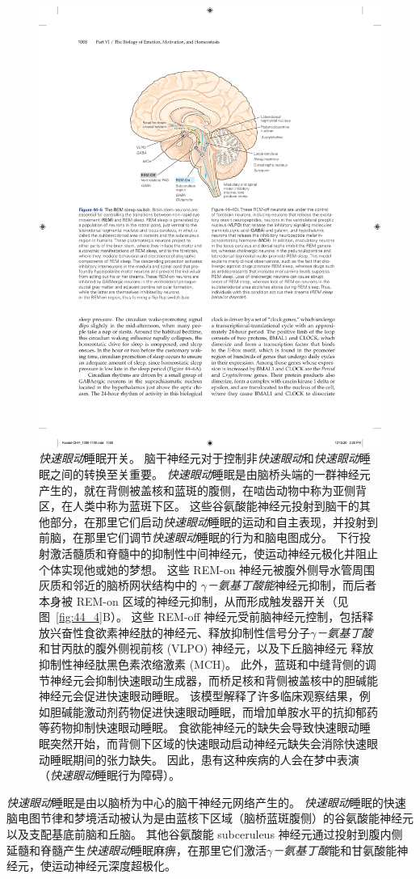 \begin{figure}[htbp]
	\centering
	\includegraphics[width=0.6\linewidth]{chap44/fig_44_5}
	\caption{\textit{快速眼动}睡眠开关。 脑干神经元对于控制非\textit{快速眼动}和\textit{快速眼动}睡眠之间的转换至关重要。
		\textit{快速眼动}睡眠是由脑桥头端的一群神经元产生的，就在背侧被盖核和蓝斑的腹侧，在啮齿动物中称为亚侧背区，在人类中称为蓝斑下区。
		这些谷氨酸能神经元投射到脑干的其他部分，在那里它们启动\textit{快速眼动}睡眠的运动和自主表现，并投射到前脑，在那里它们调节\textit{快速眼动}睡眠的行为和脑电图成分。
		下行投射激活髓质和脊髓中的抑制性中间神经元，使运动神经元极化并阻止个体实现他或她的梦想。
		这些 REM-on 神经元被腹外侧导水管周围灰质和邻近的脑桥网状结构中的 \textit{$\gamma$－氨基丁酸能}神经元抑制，而后者本身被 REM-on 区域的神经元抑制，从而形成触发器开关（见图~\ref{fig:44_4}B）。
		这些 REM-off 神经元受前脑神经元控制，包括释放兴奋性食欲素神经肽的神经元、释放抑制性信号分子\textit{$\gamma$－氨基丁酸}和甘丙肽的腹外侧视前核 (VLPO) 神经元，以及下丘脑神经元 释放抑制性神经肽黑色素浓缩激素 (MCH)。
		此外，蓝斑和中缝背侧的调节神经元会抑制快速眼动生成器，而桥足核和背侧被盖核中的胆碱能神经元会促进快速眼动睡眠。
		该模型解释了许多临床观察结果，例如胆碱能激动剂药物促进快速眼动睡眠，而增加单胺水平的抗抑郁药等药物抑制快速眼动睡眠。
		食欲能神经元的缺失会导致快速眼动睡眠突然开始，而背侧下区域的快速眼动启动神经元缺失会消除快速眼动睡眠期间的张力缺失。
		因此，患有这种疾病的人会在梦中表演（\textit{快速眼动}睡眠行为障碍）。}
	\label{fig:44_5}
\end{figure}


\textit{快速眼动}睡眠是由以脑桥为中心的脑干神经元网络产生的。
\textit{快速眼动}睡眠的快速脑电图节律和梦境活动被认为是由蓝核下区域（脑桥蓝斑腹侧）的谷氨酸能神经元以及支配基底前脑和丘脑。
其他谷氨酸能 subceruleus 神经元通过投射到腹内侧延髓和脊髓产生\textit{快速眼动}睡眠麻痹，在那里它们激活\textit{$\gamma$－氨基丁酸}能和甘氨酸能神经元，使运动神经元深度超极化。


